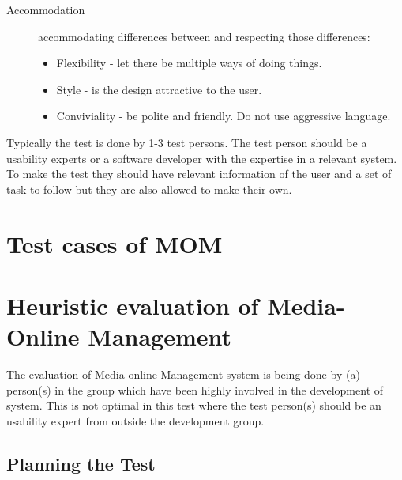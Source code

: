 \begin{description}
\item[Accommodation] accommodating differences between and respecting those differences:
\begin{itemize}
	\item Flexibility - let there be multiple ways of doing things.%
	\item Style - is the design attractive to the user. %
	\item Conviviality - be polite and friendly. Do not use aggressive language.
\end{itemize}
\end{description}

Typically the test is done by 1-3 test persons\citep{HeuristicEvaluation}. The test person should be a usability experts or a software developer with the expertise in a relevant system. To make the test they should have relevant information of the user and a set of task to follow but they are also allowed to make their own.


\section{Test cases of MOM} %


\section{Heuristic evaluation of Media-Online Management}
The evaluation of Media-online Management system is being done by (a) person(s) in the group which have been highly involved in the development of system. This is not optimal in this test where the test person(s) should be an usability expert from outside the development group.

\subsection{Planning the Test}